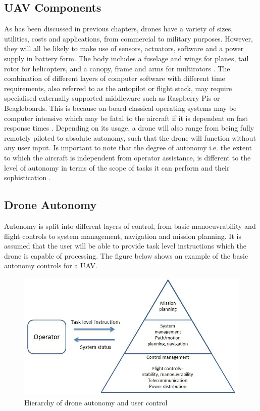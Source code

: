 \subsection{UAV Components}
As has been discussed in previous chapters, drones have a variety of sizes, utilities, costs and applications, from commercial to military purposes. However, they will all be likely to make use of sensors, actuators, software and a power supply in battery form. The body includes a fuselage and wings for planes, tail rotor for helicopters, and a canopy, frame and arms for multirotors \cite{mitchjohnson2015}. The combination of different layers of computer software with different time requirements, also referred to as the autopilot or flight stack, may require specialised externally supported middleware such as Raspberry Pis or Beagleboards. This is because on-board classical operating systems may be computer intensive which may be fatal to the aircraft if it is dependent on fast response times \cite{paparazzi2016}. 
Depending on its usage, a drone will also range from being fully remotely piloted to absolute autonomy, such that the drone will function without any user input. Is important to note that the degree of autonomy i.e. the extent to which the aircraft is independent from operator assistance, is different to the level of autonomy in terms of the scope of tasks it can perform and their sophistication \cite{williammarra2012}.

\subsection{Drone Autonomy}
Autonomy is split into different layers of control, from basic manoeuvrability and flight controls to system management, navigation and mission planning. It is assumed that the user will be able to provide task level instructions which the drone is capable of processing. The figure below shows an example of the basic autonomy controls for a UAV.

\begin{figure}
\centering	
\includegraphics[scale=0.4]{img/autopyra}	
\caption{Hierarchy of drone autonomy and user control}
\end{figure}


